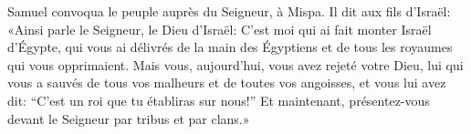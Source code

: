 Samuel convoqua le peuple auprès du Seigneur, à Mispa.
Il dit aux fils d’Israël: «Ainsi parle le Seigneur, le Dieu d’Israël:
	C’est moi qui ai fait monter Israël d’Égypte,
	qui vous ai délivrés de la main des Égyptiens
	et de tous les royaumes qui vous opprimaient.
Mais vous, aujourd’hui, vous avez rejeté votre Dieu,
	lui qui vous a sauvés de tous vos malheurs et de toutes vos angoisses,
	et vous lui avez dit:
	“C’est un roi que tu établiras sur nous!”
Et maintenant, présentez-vous devant le Seigneur par tribus et par clans.»
